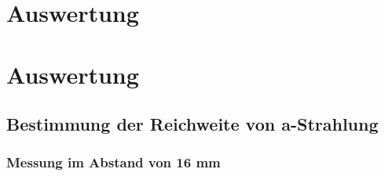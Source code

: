 \section{Auswertung}
\label{sec:Auswertung}

\section{Auswertung}
\label{sec:Auswertung}

\subsection{Bestimmung der Reichweite von a-Strahlung}

\subsubsection{Messung im Abstand von 16 mm}

